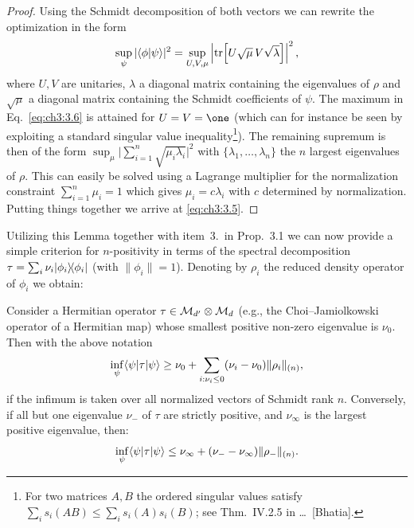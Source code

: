 \documentclass[11pt,a4paper]{article}
\numberwithin{equation}{section}
\begin{document}
\begin{proof}
    Using the Schmidt decomposition of both vectors we can rewrite the optimization in the form
    \begin{equation}\label{eq:ch3:3.6}
        \sup_{\psi} |\langle\phi|\psi\rangle|^2
        = \sup_{U,V,\mu} \left|\operatorname{tr}\!\left[U\sqrt{\mu}\,V\sqrt{\lambda}\right]\right|^2,
    \end{equation}
    where $U,V$ are unitaries, $\lambda$ a diagonal matrix containing the eigenvalues of $\rho$ and $\sqrt{\mu}$ a
    diagonal matrix containing the Schmidt coefficients of $\psi$. The maximum in Eq.~\eqref{eq:ch3:3.6} is
    attained for $U=V=\one$ (which can for instance be seen by exploiting a standard singular value
    inequality\footnote{For two matrices $A,B$ the ordered singular values satisfy $\sum_i s_i(AB)\le \sum_i s_i(A)s_i(B)$;
    see Thm.~IV.2.5 in \dots\ [Bhatia].}). The remaining supremum is then of the
    form $\sup_{\mu}\bigl|\sum_{i=1}^n \sqrt{\mu_i\lambda_i}\bigr|^2$ with
    $\{\lambda_1,\dots,\lambda_n\}$ the $n$ largest eigenvalues of $\rho$. This
    can easily be solved using a Lagrange multiplier for the normalization constraint
    $\sum_{i=1}^n \mu_i=1$ which gives $\mu_i=c\lambda_i$ with $c$ determined by normalization.
    Putting things together we arrive at \eqref{eq:ch3:3.5}.
\end{proof}

Utilizing this Lemma together with item~3.\ in Prop.~3.1 we can now provide
a simple criterion for $n$-positivity in terms of the spectral decomposition
$\tau=\sum_i \nu_i |\phi_i\rangle\!\langle\phi_i|$ (with $\|\phi_i\|=1$). Denoting by
$\rho_i$ the reduced density operator of $\phi_i$ we obtain:

\begin{proposition}
    Consider a Hermitian operator $\tau\in \mathcal{M}_{d'}\otimes \mathcal{M}_d$ (e.g., the Choi--Jamiolkowski operator of a Hermitian map)
    whose smallest positive non-zero eigenvalue is $\nu_0$. Then with the above notation
    \begin{equation}\label{eq:ch3:3.7}
        \inf_{\psi}\langle\psi|\tau|\psi\rangle \ge \nu_0 + \sum_{i:\nu_i\le 0} (\nu_i-\nu_0)\|\rho_i\|_{(n)},
    \end{equation}
    if the infimum is taken over all normalized vectors of Schmidt rank $n$. Conversely, if all but one eigenvalue
    $\nu_-$ of $\tau$ are strictly positive, and $\nu_\infty$ is the largest positive eigenvalue, then:
    \begin{equation}\label{eq:ch3:3.8}
        \inf_{\psi}\langle\psi|\tau|\psi\rangle \le \nu_\infty + (\nu_- - \nu_\infty)\|\rho_-\|_{(n)}.
    \end{equation}
\end{proposition}
\end{document}
